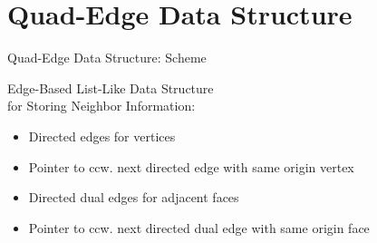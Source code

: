\documentclass[aspectratio=169,fleqn]{beamer}
\begin{document}
\section{Quad-Edge Data Structure}
  \begin{frame}{Quad-Edge Data Structure: Scheme}
    \begin{minipage}[c]{0.49\textwidth}
      Edge-Based List-Like Data Structure \\
      for Storing Neighbor Information:
      \onslide<+->
      \begin{itemize}
        \item<+-> Directed edges for vertices
        \item<+-> Pointer to ccw. next directed edge with same origin vertex
        \item<+-> Directed dual edges for adjacent faces
        \item<+-> Pointer to ccw. next directed dual edge with same origin face
      \end{itemize}
    \end{minipage}
    \hfill
    \begin{minipage}[c]{0.49\textwidth}
      \center

\end{minipage}
\end{frame}
\end{document}
